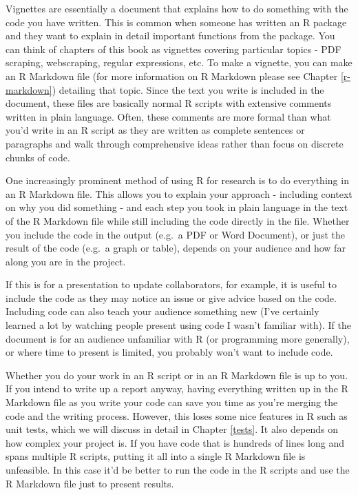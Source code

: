 \documentclass[
  a4paper,
]{krantz}
\begin{document}
Vignettes are essentially a document that explains how to do
something with the code you have written. This is common
when someone has written an R package and they want to
explain in detail important functions from the package. You
can think of chapters of this book as vignettes covering
particular topics - PDF scraping, webscraping, regular
expressions, etc. To make a vignette, you can make an R
Markdown file (for more information on R Markdown please see
Chapter \ref{r-markdown}) detailing that topic. Since the
text you write is included in the document, these files are
basically normal R scripts with extensive comments written
in plain language. Often, these comments are more formal
than what you'd write in an R script as they are written as
complete sentences or paragraphs and walk through
comprehensive ideas rather than focus on discrete chunks of
code.

One increasingly prominent method of using R for research is
to do everything in an R Markdown file. This allows you to
explain your approach - including context on why you did
something - and each step you took in plain language in the
text of the R Markdown file while still including the code
directly in the file. Whether you include the code in the
output (e.g.~a PDF or Word Document), or just the result of
the code (e.g.~a graph or table), depends on your audience
and how far along you are in the project.

If this is for a presentation to update collaborators, for
example, it is useful to include the code as they may notice
an issue or give advice based on the code. Including code
can also teach your audience something new (I've certainly
learned a lot by watching people present using code I wasn't
familiar with). If the document is for an audience
unfamiliar with R (or programming more generally), or where
time to present is limited, you probably won't want to
include code.

Whether you do your work in an R script or in an R Markdown
file is up to you. If you intend to write up a report
anyway, having everything written up in the R Markdown file
as you write your code can save you time as you're merging
the code and the writing process. However, this loses some
nice features in R such as unit tests, which we will discuss
in detail in Chapter \ref{tests}. It also depends on how
complex your project is. If you have code that is hundreds
of lines long and spans multiple R scripts, putting it all
into a single R Markdown file is unfeasible. In this case
it'd be better to run the code in the R scripts and use the
R Markdown file just to present results.
\end{document}
